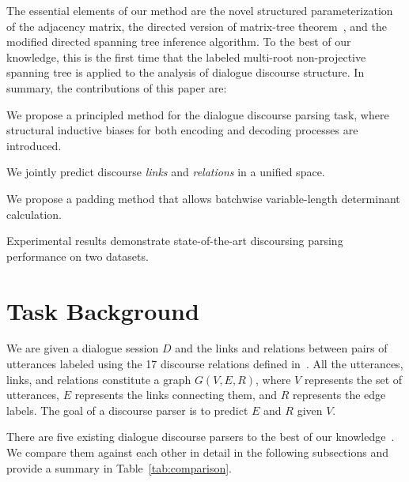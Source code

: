 \documentclass[11pt]{article}
\begin{document}
The essential elements of our method are the novel structured parameterization of the adjacency matrix, the directed version of matrix-tree theorem~\cite{tutte1984graph,koo2007structured}, and the modified directed spanning tree inference algorithm. To the best of our knowledge, this is the first time that the labeled multi-root non-projective spanning tree is applied to the analysis of dialogue discourse structure.
In summary, the contributions of this paper are:
\begin{compactitem}
    \item We propose a principled method for the dialogue discourse parsing task, where structural inductive biases for both encoding and decoding processes are introduced.
    \item We jointly predict discourse \emph{links} and \emph{relations} in a unified space.
    \item We propose a padding method that allows batchwise variable-length determinant calculation.
\item Experimental results demonstrate state-of-the-art discoursing parsing performance on two datasets.
\end{compactitem}

\section{Task Background}
\label{sec:task}
We are given a dialogue session $D$ and the links and relations between pairs of utterances labeled using the 17 discourse relations defined in~\citet{asher2016discourse}. All the utterances, links, and relations constitute a graph $G(V, E, R)$, where $V$ represents the set of utterances, $E$ represents the links connecting them, and $R$ represents the edge labels. The goal of a discourse parser is to predict $E$ and $R$ given $V$.

There are five existing dialogue discourse parsers to the best of our knowledge~\cite{afantenos2015discourse,perret2016integer,shi2019deep,wangstructure,liu-chen-2021-improving}. We compare them against each other in detail in the following subsections and provide a summary in Table~\ref{tab:comparison}.
\end{document}
